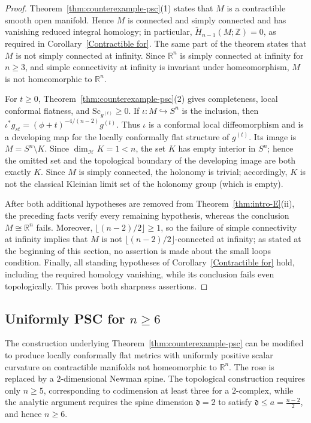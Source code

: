 \documentclass[12pt,oneside,a4paper]{article}
\theoremstyle{mytheorem}
\theoremstyle{remark}
\theoremstyle{definition}
\begin{document}
\begin{proof}
Theorem~\ref{thm:counterexample-psc}\textup{(1)} states that $M$ is a contractible smooth
open manifold.  Hence $M$ is connected and simply connected and has
vanishing reduced integral homology; in particular,
$\widetilde H_{n-1}(M;\mathbb Z)=0$, as required in
Corollary~\ref{Contractible for}.  The same part of the theorem states
that $M$ is not simply connected at infinity.  Since $\mathbb R^n$ is
simply connected at infinity for $n\geq3$, and simple connectivity at
infinity is invariant under homeomorphism, $M$ is not homeomorphic to
$\mathbb R^n$.

For $t\geq0$, Theorem~\ref{thm:counterexample-psc}\textup{(2)} gives completeness, local
conformal flatness, and $\mathrm{Sc}_{g^{(t)}}\geq0$.  If
$\iota:M\hookrightarrow S^n$ is the inclusion, then
$\iota^*g_{st}=(\phi+t)^{-4/(n-2)}g^{(t)}.$
Thus $\iota$ is a conformal local diffeomorphism and is a developing map
for the locally conformally flat structure of $g^{(t)}$.  Its image is
$M=S^n\setminus K$.  Since $\dim_{\mathcal H}K=1<n$, the set $K$ has
empty interior in $S^n$; hence the omitted set and the topological
boundary of the developing image are both exactly $K$.  Since $M$ is
simply connected, the holonomy is trivial;
accordingly, $K$ is not the classical Kleinian limit set of the holonomy
group (which is empty).

After both additional hypotheses are removed from
Theorem~\ref{thm:intro-E}\textup{(ii)}, the preceding facts verify every remaining
hypothesis, whereas the conclusion $M\cong\mathbb R^n$ fails.  Moreover,
$\lfloor(n-2)/2\rfloor\geq1$, so the failure of simple connectivity at
infinity implies that $M$ is not
$\lfloor(n-2)/2\rfloor$-connected at infinity; as stated at the beginning
of this section, no assertion is made about the small loops condition.
Finally, all standing hypotheses of Corollary~\ref{Contractible for}
hold, including the required homology vanishing, while its conclusion
fails even topologically.  This proves both sharpness assertions.
\end{proof}




\subsection{\texorpdfstring{Uniformly PSC for $n\geq 6$}{Uniformly PSC for n >= 6}}

The construction underlying Theorem~\ref{thm:counterexample-psc} can be modified to
produce locally conformally flat metrics with uniformly positive scalar
curvature on contractible manifolds not homeomorphic to $\mathbb R^n$.
The rose is replaced by a $2$-dimensional Newman spine.  The topological
construction requires only $n\geq 5$, corresponding to codimension at
least three for a $2$-complex, while the analytic argument requires the
spine dimension $\mathfrak d=2$ to satisfy
$\mathfrak d\leq a=\frac{n-2}{2}$, and hence $n\geq 6$.
\end{document}

